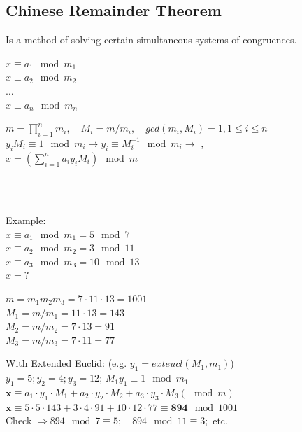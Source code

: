 \subsection{Chinese Remainder Theorem}
Is a method of solving certain simultaneous systems of congruences.\\
\begin{minipage}{4cm}
$x \equiv a_1 \mod m_1$\\
$x \equiv a_2 \mod m_2$\\
$\ldots$\\
$x \equiv a_n \mod m_n$\\
\end{minipage}
\begin{minipage}{14cm}
$m=\displaystyle\prod_{i=1}^{n} m_i, \quad M_i=m/m_i, \quad gcd(m_i, M_i)=1, 1 \leq i \leq n$\\
$y_iM_i \equiv 1 \mod m_i \to y_i\equiv M_i^{-1} \mod m_i \to$ , \\
$x=\left(\displaystyle\sum_{i=1}^{n} a_i  y_i M_i \right) \mod m$
\end{minipage}\\
\\
\begin{minipage}{5cm}
Example:\\
$x\equiv a_1 \mod m_1 = 5  \mod 7$\\
$x\equiv a_2 \mod m_2 = 3  \mod 11$\\
$x\equiv a_3 \mod m_3 = 10 \mod 13$\\
$x=?$
\end{minipage}
\begin{minipage}{5cm}
$m=m_1 m_2 m_3 = 7\cdot 11 \cdot 13 = 1001$\\
$M_1=m/m_1=11 \cdot 13 = 143$\\
$M_2=m/m_2=7 \cdot 13 = 91$\\
$M_3=m/m_3=7 \cdot 11 = 77$\\
\end{minipage}
\begin{minipage}{8cm}
With Extended Euclid: (e.g. $y_1=exteucl(M_1,m_1)$)\\
$y_1=5;  y_2=4; y_3=12$; $M_1 y_1 \equiv 1 \mod m_1$\\
$\bm x\equiv a_1\cdot y_1\cdot M_1+a_2\cdot y_2\cdot M_2+a_3\cdot y_3\cdot M_3 (\mod m)$\\
$\bm x\equiv 5\cdot5\cdot143+3\cdot4\cdot91+10\cdot12\cdot77 \equiv \bm{894} \mod 1001$\\
Check $\Rightarrow 894 \mod 7 \equiv 5; \quad 894 \mod 11 \equiv 3;$ etc.
\end{minipage}

